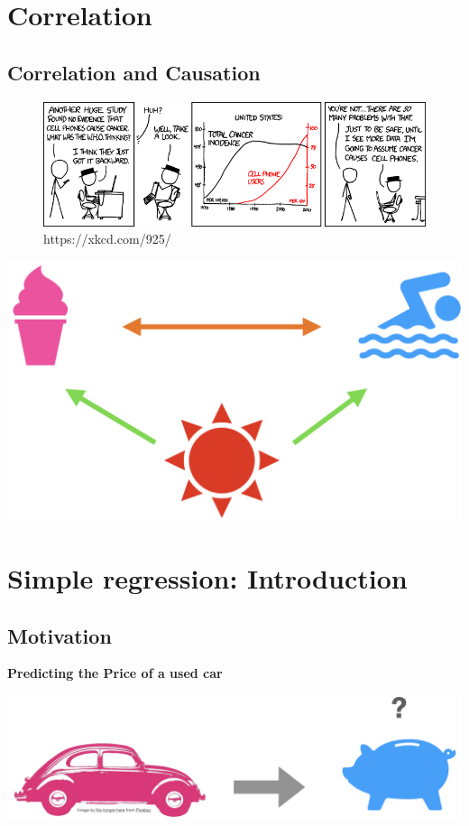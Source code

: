 \documentclass[
]{article}
\author{}
\date{\vspace{-2.5em}}
\begin{document}
\hypertarget{correlation}{%
\section{Correlation}\label{correlation}}

\hypertarget{correlation-and-causation}{%
\subsection{Correlation and Causation}\label{correlation-and-causation}}

\begin{figure}

{\centering \includegraphics[width=0.6\linewidth,height=0.6\textheight]{figures/cellphonesxkcd} 

}

\caption{https://xkcd.com/925/}\label{fig:unnamed-chunk-1}
\end{figure}

\begin{center}\includegraphics[width=0.4\linewidth,height=0.4\textheight]{figures/corr1} \end{center}

\hypertarget{simple-regression-introduction}{%
\section{Simple regression:
Introduction}\label{simple-regression-introduction}}

\hypertarget{motivation}{%
\subsection{Motivation}\label{motivation}}

\textbf{Predicting the Price of a used car}

\begin{center}\includegraphics[width=0.6\linewidth,height=0.6\textheight]{figures/motivation1} \end{center}
\end{document}
